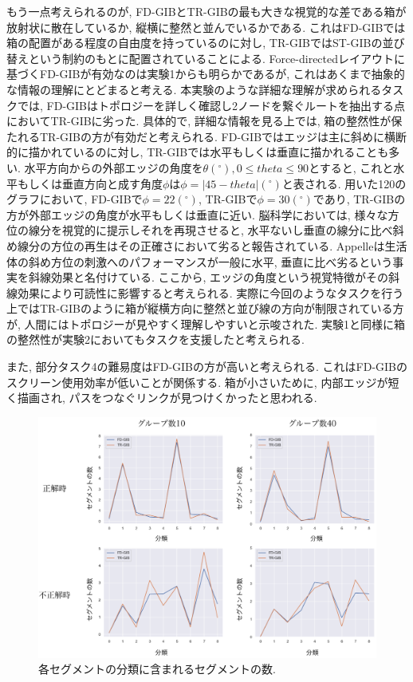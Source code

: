 \documentclass{kuee}
\begin{document}
もう一点考えられるのが, FD-GIBとTR-GIBの最も大きな視覚的な差である箱が放射状に散在しているか, 縦横に整然と並んでいるかである.
これはFD-GIBでは箱の配置がある程度の自由度を持っているのに対し, TR-GIBではST-GIBの並び替えという制約のもとに配置されていることによる.
Force-directedレイアウトに基づくFD-GIBが有効なのは実験1からも明らかであるが, これはあくまで抽象的な情報の理解にとどまると考える.
本実験のような詳細な理解が求められるタスクでは, FD-GIBはトポロジーを詳しく確認し2ノードを繋ぐルートを抽出する点においてTR-GIBに劣った.
具体的で, 詳細な情報を見る上では, 箱の整然性が保たれるTR-GIBの方が有効だと考えられる.
FD-GIBではエッジは主に斜めに横断的に描かれているのに対し, TR-GIBでは水平もしくは垂直に描かれることも多い.
水平方向からの外部エッジの角度を$\theta (^\circ), 0 \le theta \le 90$とすると, これと水平もしくは垂直方向と成す角度$\phi$は$\phi = |45 - theta|(^\circ)$と表される.
用いた120のグラフにおいて, FD-GIBで$\phi = 22(^\circ)$, TR-GIBで$\phi = 30(^\circ)$であり, TR-GIBの方が外部エッジの角度が水平もしくは垂直に近い.
脳科学においては, 様々な方位の線分を視覚的に提示しそれを再現させると, 水平ないし垂直の線分に比べ斜め線分の方位の再生はその正確さにおいて劣ると報告されている\cite{jastrow}.
Appelleは生活体の斜め方位の刺激へのパフォーマンスが一般に水平, 垂直に比べ劣るという事実を斜線効果と名付けている\cite{appelle1972perception}.
ここから, エッジの角度という視覚特徴がその斜線効果により可読性に影響すると考えられる.
実際に今回のようなタスクを行う上ではTR-GIBのように箱が縦横方向に整然と並び線の方向が制限されている方が, 人間にはトポロジーが見やすく理解しやすいと示唆された.
実験1と同様に箱の整然性が実験2においてもタスクを支援したと考えられる.

また, 部分タスク4の難易度はFD-GIBの方が高いと考えられる.
これはFD-GIBのスクリーン使用効率が低いことが関係する.
箱が小さいために, 内部エッジが短く描画され, パスをつなぐリンクが見つけくかったと思われる.

\begin{figure}[t]
  \begin{center}
  \includegraphics[width=15cm]{./images/taxonomy-result.png}
  \caption{各セグメントの分類に含まれるセグメントの数. \label{fig:taxonomy-result}}
  \end{center}
\end{figure}
\end{document}
